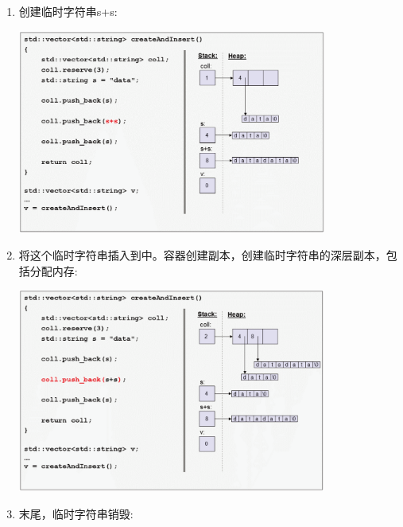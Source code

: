 \begin{itemize}
	\begin{enumerate}
		\item 创建临时字符串s+s:

		\begin{center}
			\includegraphics[width=0.8\textwidth]{part1/ch1/images/3}
		\end{center}
		\item 将这个临时字符串插入到中。容器创建副本，创建临时字符串的深层副本，包括分配内存:

		\begin{center}
			\includegraphics[width=0.8\textwidth]{part1/ch1/images/4}
		\end{center}
		\item 末尾，临时字符串销毁:


\end{enumerate}
\end{itemize}
